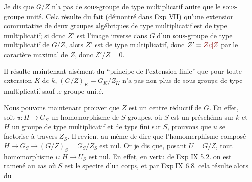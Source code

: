 Je dis que $G/Z$ n'a pas de sous-groupe de type multiplicatif autre que le sous-groupe unité. Cela résulte du fait (démontré dans Exp VII\quad) qu'une extension commutative de deux groupes algébriques de type multiplicatif est de type multiplicatif;  si donc $Z'$ est l'image inverse dans $G$ d'un sous-groupe de type multiplicatif de $G/Z$, alors $Z'$ est de type multiplicatif, donc $Z'=\unsure{Zc|Z}$ par le caractère maximal de $Z$, donc $Z'/Z=0$.

Il résulte maintenant aisément du ``principe de l'extension finie'' que pour toute extension $K$ de $k$, $(G/Z)_K=G_K/Z_K$ n'a pas non plus de sous-groupe de type multiplicatif sauf le groupe unité.

Nous pouvons maintenant prouver que $Z$ est un centre réductif de $G$. En effet, soit $u:H\longrightarrow G_S$ un homomorphisme de $S$-groupes, où $S$ est un préschéma sur $k$ et $H$ un groupe de type multiplicatif et de type fini sur $S$, prouvons que $u$ se factorise à travers $Z_S$. Il revient au même de dire que l'homomorphisme composé $H\longrightarrow G_S\longrightarrow(G/Z)_S=G_S/Z_S$ est nul. Or je dis que, posant $U=G/Z$, tout homomorphisme $u:H\longrightarrow U_S$ est nul. En effet, en vertu de Exp IX 5.2. on est ramené au cas où $S$ est le spectre d'un corps, et par Exp IX 6.8. cela résulte alors du


